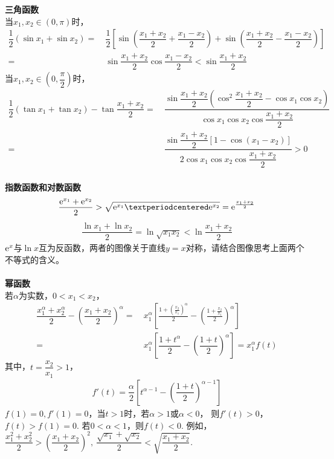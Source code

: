\begin{itemize}[leftmargin=\inteval{\myitemleftmargin}pt,itemsep=
   \inteval{\myitemitempsep}pt,topsep=\inteval{\myitemtopsep}pt]
\noindent \textbf{三角函数} \\
当$ x_1,x_2\in (0,\pi) $时，
\begin{align*}
    \dfrac{1}{2} \left(\sin x_1 + \sin x_2 \right) =&\ 
    \dfrac{1}{2} \left[ \sin \left(\dfrac{x_1+x_2}{2}+\dfrac{x_1-x_2}{2}\right)  + 
    \sin \left(\dfrac{x_1+x_2}{2}-\dfrac{x_1-x_2}{2}\right) \right] \\
    =&\  \sin \dfrac{x_1+x_2}{2} \cos \dfrac{x_1-x_2}{2} 
     < \sin \dfrac{x_1+x_2}{2}
\end{align*}
当$ x_1,x_2\in (0,\dfrac{\pi}{2}) $时，
\begin{align*}
    \dfrac{1}{2}\left(\tan x_1+\tan x_2\right)-\tan\dfrac{x_1+x_2}{2}
    =&\  \dfrac{\sin\dfrac{x_1+x_2}{2}\left(\cos^2\dfrac{x_1+x_2}{2}
        -\cos x_1\cos x_2 \right)}{\cos x_1\cos x_2 \cos\dfrac{x_1+x_2}{2}}\\
    =&\  \dfrac{\sin\dfrac{x_1+x_2}{2}\left[1-\cos(x_1-x_2) \right]}
    {2\cos x_1\cos x_2 \cos\dfrac{x_1+x_2}{2}} >0
\end{align*}
\\
\textbf{指数函数和对数函数} \\
\begin{align*}
    \dfrac{\e^{x_1}+\e^{x_2}}{2}>\sqrt{\e^{x_1}·\e^{x_2}}=\e^{\frac{x_1+x_2}{2}}
\end{align*}
\begin{align*}
    \dfrac{\ln x_1+\ln x_2}{2}=\ln \sqrt{x_1 x_2}<\ln\dfrac{x_1+x_2}{2}
\end{align*}
$ \mathrm{e}^x $与$ \ln x $互为反函数，两者的图像关于直线$ y=x $对称，请结合图像思考上面两个不等式的含义。\\
\\
\textbf{幂函数} \\
若$ \alpha $为实数，$ 0<x_1<x_2 $，
\begin{align*}
    \dfrac{x_1^{\alpha}+x_2^{\alpha}}{2}-\left( \dfrac{x_1+x_2}{2}\right)^{\alpha} =&\ 
    x_1^{\alpha}\left[\frac{1+\left( \frac{x_2}{x_1}\right)^{\alpha} }{2}-
    \left(\frac{1+\frac{x_2}{x_1}}{2} \right)^{\alpha} \right]   \\
    =&\  x_1^{\alpha}\left[ \dfrac{1+t^{\alpha}}{2}-\left(\dfrac{1+t}{2} 
    \right)^{\alpha}  \right]  =x_1^{\alpha}f(t)
\end{align*}
其中，$ t=\dfrac{x_2}{x_1}>1 $，
\begin{align*}
    f'(t)=\dfrac{\alpha}{2}\left[ t^{\alpha-1}-
    \left( \dfrac{1+t}{2}\right)^{\alpha-1}\right]
\end{align*}
$ f(1)=0,f'(1)=0 $，当$ t>1 $时，若$ \alpha>1 $或$ \alpha<0 $，
则$ f'(t)>0 $，$ f(t)>f(1)=0 $. 
若$ 0<\alpha<1 $，则$ f(t)<0 $. 
例如，$ \dfrac{x_1^2+x_2^2}{2}>\left(\dfrac{x_1+x_2}{2}\right)^2,\  \dfrac{\sqrt{x_1}+\sqrt{x_2}}{2}<\sqrt{\dfrac{x_1+x_2}{2}} $.  


\end{itemize}

